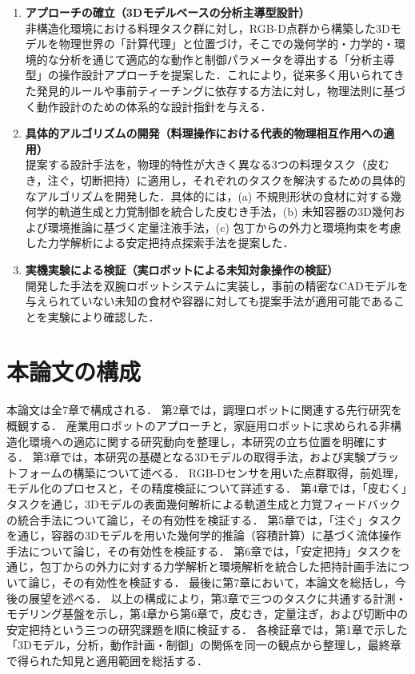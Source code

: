 \begin{enumerate}

\item \textbf{アプローチの確立（3Dモデルベースの分析主導型設計）} \\
非構造化環境における料理タスク群に対し，RGB-D点群から構築した3Dモデルを物理世界の「計算代理」と位置づけ，そこでの幾何学的・力学的・環境的な分析を通じて適応的な動作と制御パラメータを導出する「分析主導型」の操作設計アプローチを提案した．これにより，従来多く用いられてきた発見的ルールや事前ティーチングに依存する方法に対し，物理法則に基づく動作設計のための体系的な設計指針を与える．

\item \textbf{具体的アルゴリズムの開発（料理操作における代表的物理相互作用への適用）} \\
提案する設計手法を，物理的特性が大きく異なる3つの料理タスク（皮むき，注ぐ，切断把持）に適用し，それぞれのタスクを解決するための具体的なアルゴリズムを開発した．具体的には，(a) 不規則形状の食材に対する幾何学的軌道生成と力覚制御を統合した皮むき手法，(b) 未知容器の3D幾何および環境推論に基づく定量注液手法，(c) 包丁からの外力と環境拘束を考慮した力学解析による安定把持点探索手法を提案した．

\item \textbf{実機実験による検証（実ロボットによる未知対象操作の検証）} \\
開発した手法を双腕ロボットシステムに実装し，事前の精密なCADモデルを与えられていない未知の食材や容器に対しても提案手法が適用可能であることを実験により確認した．

\end{enumerate}

\section{本論文の構成}


本論文は全7章で構成される．
第2章では，調理ロボットに関連する先行研究を概観する．
産業用ロボットのアプローチと，家庭用ロボットに求められる非構造化環境への適応に関する研究動向を整理し，本研究の立ち位置を明確にする．
第3章では，本研究の基礎となる3Dモデルの取得手法，および実験プラットフォームの構築について述べる．
RGB-Dセンサを用いた点群取得，前処理，モデル化のプロセスと，その精度検証について詳述する．
第4章では，「皮むく」タスクを通じ，3Dモデルの表面幾何解析による軌道生成と力覚フィードバックの統合手法について論じ，その有効性を検証する．
第5章では，「注ぐ」タスクを通じ，容器の3Dモデルを用いた幾何学的推論（容積計算）に基づく流体操作手法について論じ，その有効性を検証する．
第6章では，「安定把持」タスクを通じ，包丁からの外力に対する力学解析と環境解析を統合した把持計画手法について論じ，その有効性を検証する．
最後に第7章において，本論文を総括し，今後の展望を述べる．
以上の構成により，第3章で三つのタスクに共通する計測・モデリング基盤を示し，第4章から第6章で，皮むき，定量注ぎ，および切断中の安定把持という三つの研究課題を順に検証する．
各検証章では，第1章で示した「3Dモデル，分析，動作計画・制御」の関係を同一の観点から整理し，最終章で得られた知見と適用範囲を総括する．




